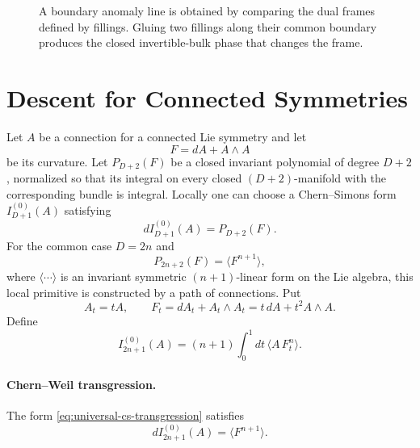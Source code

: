 \begin{figure}[H]
\centering
{}
\caption{A boundary anomaly line is obtained by comparing the dual frames
defined by fillings.  Gluing two fillings along their common boundary
produces the closed invertible-bulk phase that changes the frame.}
\label{fig:inflow-boundary-line-gluing}
\end{figure}

\section{Descent for Connected Symmetries}

Let \(A\) be a connection for a connected Lie symmetry and let
\[
  F=dA+A\wedge A
\]
be its curvature.  Let \(P_{D+2}(F)\) be a closed invariant polynomial of
degree \(D+2\), normalized so that its integral on every closed
\((D+2)\)-manifold with the corresponding bundle is integral.  Locally one
can choose a Chern--Simons form \(I_{D+1}^{(0)}(A)\) satisfying
\[
  dI_{D+1}^{(0)}(A)=P_{D+2}(F).
\]
For the common case \(D=2n\) and
\[
  P_{2n+2}(F)=\langle F^{n+1}\rangle ,
\]
where \(\langle\cdots\rangle\) is an invariant symmetric
\((n+1)\)-linear form on the Lie algebra, this local primitive is
constructed by a path of connections.  Put
\[
  A_t=tA,\qquad
  F_t=dA_t+A_t\wedge A_t=t\,dA+t^2A\wedge A .
\]
Define
\begin{equation}
  I_{2n+1}^{(0)}(A)
  =
  (n+1)\int_0^1dt\,\langle A\,F_t^n\rangle .
  \label{eq:universal-cs-transgression}
\end{equation}

\paragraph{Chern--Weil transgression.}
The form \eqref{eq:universal-cs-transgression} satisfies
\[
  d I_{2n+1}^{(0)}(A)=\langle F^{n+1}\rangle .
\]

